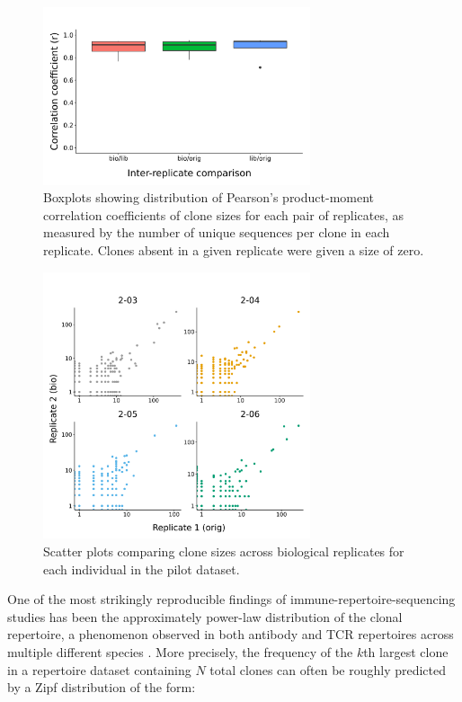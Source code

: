 \begin{figure}
\centering
\includegraphics[width = 0.7\textwidth]{_Figures/png/pilot-clone-sizes-cor-boxplots}
\caption{Boxplots showing distribution of Pearson's product-moment correlation coefficients of clone sizes for each pair of replicates, as measured by the number of unique sequences per clone in each replicate. Clones absent in a given replicate were given a size of zero.}
\label{fig:igseq-pilot-clone-sizes-cor-boxplots}
\end{figure}

\begin{figure}
\centering
\includegraphics[width = 0.7\textwidth]{_Figures/png/pilot-clone-sizes-cor-scatter}
\caption{Scatter plots comparing clone sizes across biological replicates for each individual in the pilot dataset.}
\label{fig:igseq-pilot-clone-sizes-cor-scatter}
\end{figure}

One of the most strikingly reproducible findings of immune-repertoire-sequencing studies has been the approximately power-law distribution of the clonal repertoire, a phenomenon observed in both antibody and TCR repertoires across multiple different species \parencite{desponds2016fluctuating,mora2016diversity}. More precisely, the frequency of the $k$th largest clone in a repertoire dataset containing $N$ total clones can often be roughly predicted by a Zipf distribution \parencite{mora2010mentropy} of the form:

